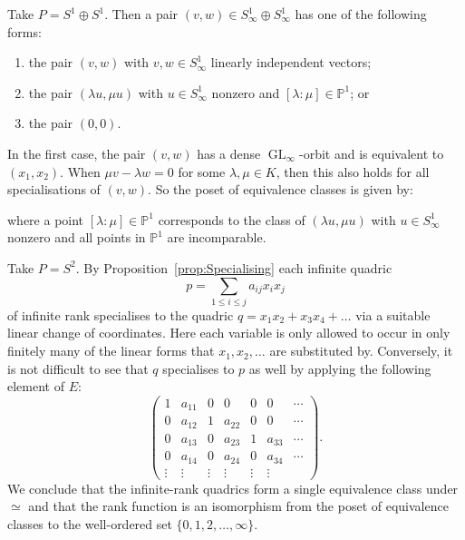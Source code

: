 \documentclass{amsart}
\theoremstyle{plain}
\theoremstyle{definition}
\newcommand{\PP}{\mathbb{P}}
\DeclareMathOperator{\GL}{GL}
\begin{document}
\begin{ex}
Take $P = S^1 \oplus S^1$. Then a pair $(v,w)\in S^1_{\infty}\oplus S^1_{\infty}$ has one of the following forms:
\begin{enumerate}
\item the pair $(v,w)$ with $v,w\in S^1_{\infty}$ linearly independent vectors;
\item the pair $(\lambda u,\mu u)$ with $u\in S^1_{\infty}$ nonzero and $[\lambda:\mu]\in\PP^1$; or
\item the pair $(0,0)$.
\end{enumerate}
In the first case, the pair $(v,w)$ has a dense $\GL_{\infty}$-orbit and is equivalent to $(x_1,x_2)$. When $\mu v-\lambda w=0$ for some $\lambda,\mu\in K$, then this also holds for all specialisations of $(v,w)$. So the poset of equivalence classes is given by:
\begin{center}
\end{center}
where a point $[\lambda:\mu]\in \PP^1$ corresponds to the class of $(\lambda u, \mu u)$ with $u \in S^1_{\infty}$ nonzero and all points in $\PP^1$ are incomparable.
\end{ex}

\begin{ex}\label{ex:Quadrics}
Take $P=S^2$. By Proposition~\ref{prop:Specialising} each infinite quadric
\[
p=\sum_{1 \leq i \leq j} a_{ij} x_i x_j
\]
of infinite rank specialises to the quadric $q=x_1x_2 + x_3x_4 + \ldots$
via a suitable linear change of coordinates. Here each variable is only allowed to occur in only finitely many of the linear forms that $x_1,x_2,\ldots$ are substituted by.
Conversely, it is not difficult to see that $q$ specialises
to $p$ as well by applying the following element of $E$:
\[
\begin{pmatrix}
1 & a_{11} & 0 & 0      & 0 & 0 & \cdots\\
0 & a_{12} & 1 & a_{22} & 0 & 0 & \cdots\\
0 & a_{13} & 0 & a_{23} & 1 & a_{33} &\cdots\\
0 & a_{14} & 0 & a_{24} & 0 & a_{34} &\cdots\\
\vdots & \vdots & \vdots & \vdots & \vdots & \vdots &
\end{pmatrix}.
\]
We conclude that the infinite-rank quadrics form a single
equivalence class under $\simeq$
and that the rank function is an isomorphism from the poset of equivalence classes to the well-ordered
set $\{0,1,2,\ldots,\infty\}$.
\end{ex}
\end{document}
